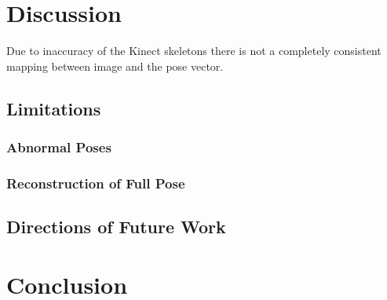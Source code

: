 \documentclass[11pt]{article} %
\begin{document}
\section{Discussion}

Due to inaccuracy of the Kinect skeletons there is not a completely consistent mapping between image and the pose vector. 

\subsection{Limitations}

\subsubsection{Abnormal Poses}
\label{sec:abnormals}

\subsubsection{Reconstruction of Full Pose}

\subsection{Directions of Future Work}


\section{Conclusion}







%
\end{document}
